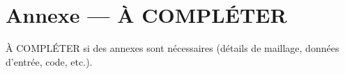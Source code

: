 \documentclass{MemoireMaster}
\begin{document}
\newpage
\appendix
\section{Annexe --- À COMPLÉTER}
À COMPLÉTER si des annexes sont nécessaires (détails de maillage, données d'entrée, code, etc.).
\end{document}
